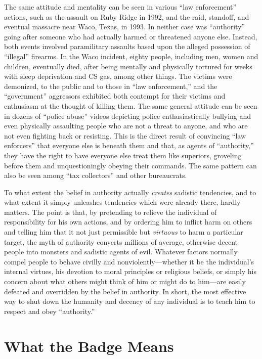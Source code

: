 \documentclass{book}
\begin{document}
The same attitude and mentality can be seen in various \enquote{law enforcement} actions, such as the assault on Ruby Ridge in 1992, and the raid, standoff, and eventual massacre near Waco, Texas, in 1993. In neither case was \enquote{authority} going after someone who had actually harmed or threatened anyone else. Instead, both events involved paramilitary assaults based upon the alleged possession of \enquote{illegal} firearms. In the Waco incident, eighty people, including men, women and children, eventually died, after being mentally and physically tortured for weeks with sleep deprivation and CS gas, among other things. The victims were demonized, to the public and to those in \enquote{law enforcement,} and the \enquote{government} aggressors exhibited both contempt for their victims and enthusiasm at the thought of killing them. The same general attitude can be seen in dozens of \enquote{police abuse} videos depicting police enthusiastically bullying and even physically assaulting people who are not a threat to anyone, and who are not even fighting back or resisting. This is the direct result of convincing \enquote{law enforcers} that everyone else is beneath them and that, as agents of \enquote{authority,} they have the right to have everyone else treat them like superiors, groveling before them and unquestioningly obeying their commands. The same pattern can also be seen among \enquote{tax collectors} and other bureaucrats.

To what extent the belief in authority actually \emph{creates} sadistic tendencies, and to what extent it simply unleashes tendencies which were already there, hardly matters. The point is that, by pretending to relieve the individual of responsibility for his own actions, and by ordering him to inflict harm on others and telling him that it not just permissible but \emph{virtuous} to harm a particular target, the myth of authority converts millions of average, otherwise decent people into monsters and sadistic agents of evil. Whatever factors normally compel people to behave civilly and nonviolently---whether it be the individual's internal virtues, his devotion to moral principles or religious beliefs, or simply his concern about what others might think of him or might do to him---are easily defeated and overridden by the belief in authority. In short, the most effective way to shut down the humanity and decency of any individual is to teach him to respect and obey \enquote{authority.}

\section{What the Badge Means}
\end{document}
